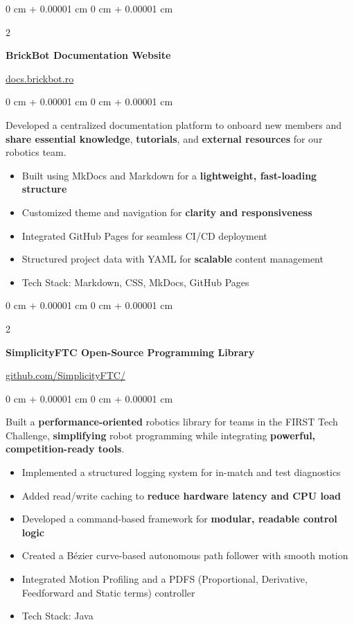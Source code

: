 \documentclass[10pt, letterpaper]{article}
\newenvironment{highlights}{
    \begin{itemize}[
        topsep=0.10 cm,
        parsep=0.10 cm,
        partopsep=0pt,
        itemsep=0pt,
        leftmargin=0 cm + 10pt
    ]
}{
    \end{itemize}
} %
\newenvironment{onecolentry}{
    \begin{adjustwidth}{
        0 cm + 0.00001 cm
    }{
        0 cm + 0.00001 cm
    }
}{
    \end{adjustwidth}
} %
\newenvironment{twocolentry}[2][]{
    \onecolentry
    \def\secondColumn{#2}
    \setcolumnwidth{\fill, 4.5 cm}
    \begin{paracol}{2}
}{
    \switchcolumn \raggedleft \secondColumn
    \end{paracol}
    \endonecolentry
} %
\begin{document}
\vspace{0.2 cm}

 \begin{twocolentry}{
    \href{https://docs.brickbot.ro}{docs.brickbot.ro}
}
    \textbf{BrickBot Documentation Website}
\end{twocolentry}

\vspace{0.10 cm}
\begin{onecolentry}
    Developed a centralized documentation platform to onboard new members and \textbf{share essential knowledge}, \textbf{tutorials}, and \textbf{external resources} for our robotics team.
    \begin{highlights}
        \item Built using MkDocs and Markdown for a \textbf{lightweight, fast-loading structure}
        \item Customized theme and navigation for \textbf{clarity and responsiveness}
        \item Integrated GitHub Pages for seamless CI/CD deployment
        \item Structured project data with YAML for \textbf{scalable} content management
        \item Tech Stack: Markdown, CSS, MkDocs, GitHub Pages
    \end{highlights}
\end{onecolentry}

\vspace{0.2 cm}

\begin{twocolentry}{
    \href{https://github.com/SimplicityFTC/SimplicityFTC-Quickstart}{github.com/SimplicityFTC/}
}
    \textbf{SimplicityFTC Open-Source Programming Library}
\end{twocolentry}

\vspace{0.10 cm}
\begin{onecolentry}
    Built a \textbf{performance-oriented} robotics library for teams in the FIRST Tech Challenge, \textbf{simplifying} robot programming while integrating \textbf{powerful, competition-ready tools}.
    \begin{highlights}
        \item Implemented a structured logging system for in-match and test diagnostics
        \item Added read/write caching to \textbf{reduce hardware latency and CPU load}
        \item Developed a command-based framework for \textbf{modular, readable control logic}
        \item Created a Bézier curve-based autonomous path follower with smooth motion
        \item Integrated Motion Profiling and a PDFS (Proportional, Derivative, Feedforward and Static terms) controller
        \item Tech Stack: Java
    \end{highlights}
\end{onecolentry}
\end{document}
